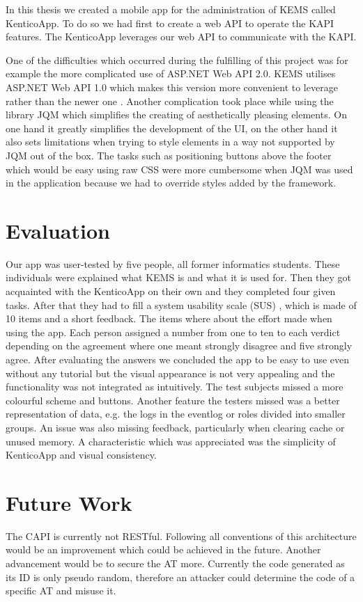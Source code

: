 In this thesis we created a mobile app for the administration of KEMS called KenticoApp. To do so we had first to create a web API to operate the KAPI features. The KenticoApp leverages our web API to communicate with the KAPI. 

One of the difficulties which occurred during the fulfilling of this project was for example the more complicated use of ASP.NET Web API 2.0. KEMS utilises ASP.NET Web API 1.0 which makes this version more convenient to leverage rather than the newer one \cite{kenticoWebAPI}. Another complication took place while using the library JQM which simplifies the creating of aesthetically pleasing elements. On one hand it greatly simplifies the development of the UI, on the other hand it also sets limitations when trying to style elements in a way not supported by JQM out of the box. The tasks such as positioning buttons above the footer which would be easy using raw CSS were more cumbersome when JQM was used in the application because we had to override styles added by the framework.

\section{Evaluation}
Our app was user-tested by five people, all former informatics students. These individuals were explained what KEMS is and what it is used for. Then they got acquainted with the KenticoApp on their own and they completed four given tasks. After that they had to fill a system usability scale (SUS) \cite{sus}, which is made of 10 items and a short feedback. The items where about the effort made when using the app. Each person assigned a number from one to ten to each verdict depending on the agreement where one meant strongly disagree and five strongly agree. After evaluating the answers we concluded the app to be easy to use even without any tutorial but the visual appearance is not very appealing and the functionality was not integrated as intuitively. The test subjects missed a more colourful scheme and buttons. Another feature the testers missed was a better representation of data, e.g. the logs in the eventlog or roles divided into smaller groups. An issue was also missing feedback, particularly when clearing cache or unused memory. A characteristic which was appreciated was the simplicity of KenticoApp and visual consistency.

\section{Future Work}
The CAPI is currently not RESTful. Following all conventions of this architecture would be an improvement which could be achieved in the future. Another advancement would be to secure the AT more. Currently the code generated as its ID is only pseudo random, therefore an attacker could determine the code of a specific AT and misuse it. 

